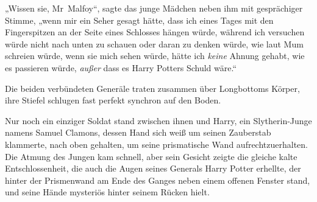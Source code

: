 „Wissen sie, Mr~Malfoy“, sagte das junge Mädchen neben ihm mit gesprächiger Stimme, „wenn mir ein Seher gesagt hätte, dass ich eines Tages mit den Fingerspitzen an der Seite eines Schlosses hängen würde, während ich versuchen würde nicht nach unten zu schauen oder daran zu denken würde, wie laut Mum schreien würde, wenn sie mich sehen würde, hätte ich \emph{keine} Ahnung gehabt, wie es passieren würde, \emph{außer} dass es Harry Potters Schuld wäre.“


Die beiden verbündeten Generäle traten zusammen über Longbottoms Körper, ihre Stiefel schlugen fast perfekt synchron auf den Boden.

Nur noch ein einziger Soldat stand zwischen ihnen und Harry, ein Slytherin-Junge namens Samuel Clamons, dessen Hand sich weiß um seinen Zauberstab klammerte, nach oben gehalten, um seine prismatische Wand aufrechtzuerhalten. Die Atmung des Jungen kam schnell, aber sein Gesicht zeigte die gleiche kalte Entschlossenheit, die auch die Augen seines Generals Harry Potter erhellte, der hinter der Prismenwand am Ende des Ganges neben einem offenen Fenster stand, und seine Hände mysteriös hinter seinem Rücken hielt.

